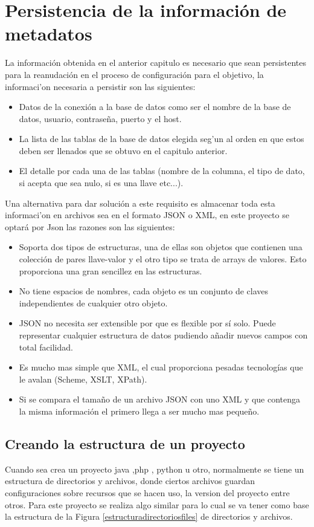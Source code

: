 \section{Persistencia de la informaci\'on de metadatos}
La informaci\'on obtenida en el anterior capitulo es necesario que sean persistentes para la reanudaci\'on  en el proceso de configuraci\'on para el objetivo, la informaci'on necesaria a persistir son las siguientes:
\begin{itemize}
\item Datos de la conexi\'on a la base de datos como ser el nombre de la base de datos, usuario, contrase\~na, puerto y el host.
\item La lista de las tablas de la base de datos elegida seg'un al orden en que estos deben ser llenados que se obtuvo en el capitulo anterior.
\item El detalle por cada una de las tablas (nombre de la columna, el tipo de dato, si acepta que sea nulo, si es una llave etc...).  
\end{itemize}
Una alternativa para dar soluci\'on a este requisito es almacenar toda esta informaci'on en archivos sea en el formato JSON o XML, en este proyecto se optar\'a por Json las razones son las siguientes:

\begin{itemize}
\item Soporta dos tipos de estructuras, una de ellas son objetos que contienen una colecci\'on de pares llave-valor y el otro tipo se trata de arrays de valores. Esto proporciona una gran sencillez en las estructuras.
\item No tiene espacios de nombres, cada objeto es un conjunto de claves independientes de cualquier otro objeto.
\item JSON no necesita ser extensible por que es flexible por s\'i solo. Puede representar cualquier estructura de datos pudiendo a\~nadir nuevos campos con total facilidad.
\item Es mucho mas simple que XML, el cual proporciona pesadas tecnolog\'ias que le avalan (Scheme, XSLT, XPath).
\item Si se compara el tama\~no de un archivo JSON con uno XML y que contenga la misma informaci\'on el primero llega a ser mucho mas peque\~no.
\end{itemize} 
\subsection{Creando la estructura de un proyecto}
Cuando sea crea un proyecto java ,php , python u otro, normalmente se tiene un estructura de directorios y archivos, donde ciertos archivos guardan configuraciones sobre recursos que se hacen uso, la version del proyecto entre otros. Para este proyecto se realiza algo similar para lo cual se va tener como base la estructura de la Figura \ref{estructuradirectoriosfiles} de directorios y archivos.

